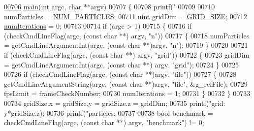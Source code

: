 \begin{DoxyCode}
{{{\hypertarget{particles_8cpp_source_l00706}{}\hyperlink{particles_8cpp_a3c04138a5bfe5d72780bb7e82a18e627}{00706} \hyperlink{particles_8cpp_a3c04138a5bfe5d72780bb7e82a18e627}{main}(\textcolor{keywordtype}{int} argc, \textcolor{keywordtype}{char} **argv)
00707 \{
00708     printf(\textcolor{stringliteral}{"%
00709 
00710     \hyperlink{particles_8cpp_a05b8a90212054a3eb1a036ae0c269596}{numParticles} = \hyperlink{particles_8cpp_a75cbc112dce4b21c13fe7bb671accab1}{NUM\_PARTICLES};
00711     \hyperlink{particles__kernel_8cuh_a91ad9478d81a7aaf2593e8d9c3d06a14}{uint} gridDim = \hyperlink{particles_8cpp_a08246606c233e7785a497c09672f366f}{GRID\_SIZE};
00712     \hyperlink{particles_8cpp_ad026ebba8c4123cf7b82751c88761f31}{numIterations} = 0;
00713 
00714     \textcolor{keywordflow}{if} (argc > 1)
00715     \{
00716         \textcolor{keywordflow}{if} (checkCmdLineFlag(argc, (\textcolor{keyword}{const} \textcolor{keywordtype}{char} **) argv, \textcolor{stringliteral}{"n"}))
00717         \{
00718             numParticles = getCmdLineArgumentInt(argc, (\textcolor{keyword}{const} \textcolor{keywordtype}{char} **)argv, \textcolor{stringliteral}{"n"});
00719         \}
00720 
00721         \textcolor{keywordflow}{if} (checkCmdLineFlag(argc, (\textcolor{keyword}{const} \textcolor{keywordtype}{char} **) argv, \textcolor{stringliteral}{"grid"}))
00722         \{
00723             gridDim = getCmdLineArgumentInt(argc, (\textcolor{keyword}{const} \textcolor{keywordtype}{char} **) argv, \textcolor{stringliteral}{"grid"});
00724         \}
00725 
00726         \textcolor{keywordflow}{if} (checkCmdLineFlag(argc, (\textcolor{keyword}{const} \textcolor{keywordtype}{char} **)argv, \textcolor{stringliteral}{"file"}))
00727         \{
00728             getCmdLineArgumentString(argc, (\textcolor{keyword}{const} \textcolor{keywordtype}{char} **)argv, \textcolor{stringliteral}{"file"}, &g\_refFile);
00729             fpsLimit = frameCheckNumber;
00730             numIterations = 1;
00731         \}
00732     \}
00733 
00734     gridSize.x = gridSize.y = gridSize.z = gridDim;
00735     printf(\textcolor{stringliteral}{"grid: %
      y*gridSize.z);
00736     printf(\textcolor{stringliteral}{"particles: %
00737 
00738     \textcolor{keywordtype}{bool} benchmark = checkCmdLineFlag(argc, (\textcolor{keyword}{const} \textcolor{keywordtype}{char} **) argv, \textcolor{stringliteral}{"benchmark"}) != 0;
}}}}}}
\end{DoxyCode}
